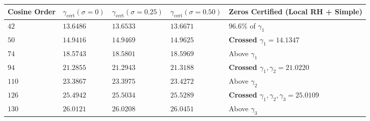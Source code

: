\documentclass[
  11pt,
]{article}
\newcounter{none} %
\begin{document}
\begin{enumerate}
  {\def\LTcaptype{none} %
  \begin{longtable}[]{@{}
    >{\centering\arraybackslash}p{}
    >{\centering\arraybackslash}p{}
    >{\centering\arraybackslash}p{}
    >{\centering\arraybackslash}p{}
    >{\raggedright\arraybackslash}p{}@{}}
  \toprule\noalign{}
  \begin{minipage}[b]{\linewidth}\centering
  Cosine Order
  \end{minipage} & \begin{minipage}[b]{\linewidth}\centering
  \(\gamma_{\text{cert}}(\sigma = 0)\)
  \end{minipage} & \begin{minipage}[b]{\linewidth}\centering
  \(\gamma_{\text{cert}}(\sigma = 0.25)\)
  \end{minipage} & \begin{minipage}[b]{\linewidth}\centering
  \(\gamma_{\text{cert}}(\sigma = 0.50)\)
  \end{minipage} & \begin{minipage}[b]{\linewidth}\raggedright
  Zeros Certified (Local RH + Simple)
  \end{minipage} \\
  \midrule\noalign{}
  \endhead
  \bottomrule\noalign{}
  \endlastfoot
  \(42\) & \(13.6486\) & \(13.6533\) & \(13.6671\) & \(96.6\%\) of
  \(\gamma_1\) \\
  \textbf{\(50\)} & \textbf{\(14.9416\)} & \textbf{\(14.9469\)} &
  \textbf{\(14.9625\)} & \textbf{Crossed \(\gamma_1 = 14.1347\)} \\
  \(74\) & \(18.5743\) & \(18.5801\) & \(18.5969\) & Above
  \(\gamma_1\) \\
  \textbf{\(94\)} & \textbf{\(21.2855\)} & \textbf{\(21.2943\)} &
  \textbf{\(21.3188\)} & \textbf{Crossed
  \(\gamma_1, \gamma_2 = 21.0220\)} \\
  \(110\) & \(23.3867\) & \(23.3975\) & \(23.4272\) & Above
  \(\gamma_2\) \\
  \textbf{\(126\)} & \textbf{\(25.4942\)} & \textbf{\(25.5034\)} &
  \textbf{\(25.5289\)} & \textbf{Crossed
  \(\gamma_1, \gamma_2, \gamma_3 = 25.0109\)} \\
  \(130\) & \(26.0121\) & \(26.0208\) & \(26.0451\) & Above
  \(\gamma_3\) \\
  \end{longtable}
}
\end{enumerate}
\end{document}
